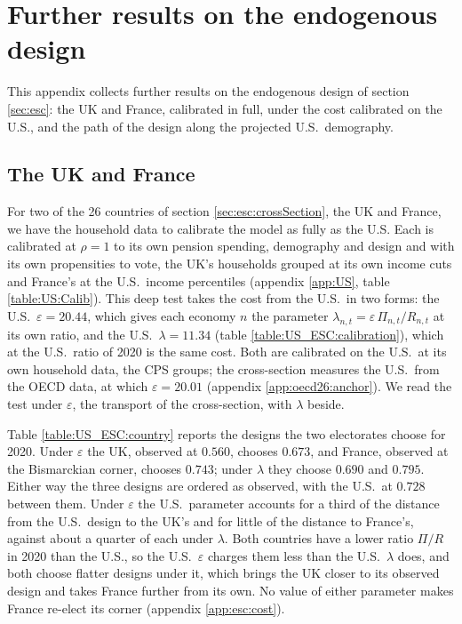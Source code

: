 \FloatBarrier
\section{Further results on the endogenous design}\label{app:escResults}\setcounter{equation}{0}
This appendix collects further results on the endogenous design of section \ref{sec:esc}: the UK and France, calibrated in full, under the cost calibrated on the U.S., and the path of the design along the projected U.S.\ demography.

\subsection{The UK and France}\label{app:escResults:countries}
For two of the 26 countries of section \ref{sec:esc:crossSection}, the UK and France, we have the household data to calibrate the model as fully as the U.S\@. Each is calibrated at $\rho = 1$ to its own pension spending, demography and design and with its own propensities to vote, the UK's households grouped at its own income cuts and France's at the U.S.\ income percentiles (appendix \ref{app:US}, table \ref{table:US:Calib}). This deep test takes the cost from the U.S.\ in two forms: the U.S.\ $\varepsilon = 20.44$, which gives each economy $n$ the parameter $\lambda_{n,t} = \varepsilon\,\Pi_{n,t}/R_{n,t}$ at its own ratio, and the U.S.\ $\lambda = 11.34$ (table \ref{table:US_ESC:calibration}), which at the U.S.\ ratio of 2020 is the same cost. Both are calibrated on the U.S.\ at its own household data, the CPS groups; the cross-section measures the U.S.\ from the OECD data, at which $\varepsilon = 20.01$ (appendix \ref{app:oecd26:anchor}). We read the test under $\varepsilon$, the transport of the cross-section, with $\lambda$ beside.

Table \ref{table:US_ESC:country} reports the designs the two electorates choose for 2020. Under $\varepsilon$ the UK, observed at $0.560$, chooses $0.673$, and France, observed at the Bismarckian corner, chooses $0.743$; under $\lambda$ they choose $0.690$ and $0.795$. Either way the three designs are ordered as observed, with the U.S.\ at $0.728$ between them. Under $\varepsilon$ the U.S.\ parameter accounts for a third of the distance from the U.S.\ design to the UK's and for little of the distance to France's, against about a quarter of each under $\lambda$. Both countries have a lower ratio $\Pi/R$ in 2020 than the U.S., so the U.S.\ $\varepsilon$ charges them less than the U.S.\ $\lambda$ does, and both choose flatter designs under it, which brings the UK closer to its observed design and takes France further from its own. No value of either parameter makes France re-elect its corner (appendix \ref{app:esc:cost}).

